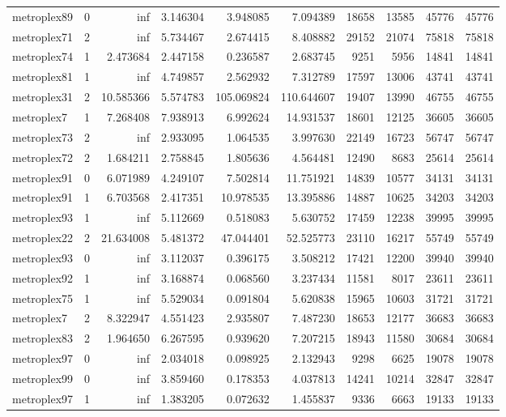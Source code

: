 \begin{longtable}{|l|r|r|r|r|r|r|r|r|r|}
metroplex89 & 0 & inf & 3.146304 & 3.948085 & 7.094389 & 18658 & 13585 & 45776 & 45776 \\
metroplex71 & 2 & inf & 5.734467 & 2.674415 & 8.408882 & 29152 & 21074 & 75818 & 75818 \\
metroplex74 & 1 & 2.473684 & 2.447158 & 0.236587 & 2.683745 & 9251 & 5956 & 14841 & 14841 \\
metroplex81 & 1 & inf & 4.749857 & 2.562932 & 7.312789 & 17597 & 13006 & 43741 & 43741 \\
metroplex31 & 2 & 10.585366 & 5.574783 & 105.069824 & 110.644607 & 19407 & 13990 & 46755 & 46755 \\
metroplex7 & 1 & 7.268408 & 7.938913 & 6.992624 & 14.931537 & 18601 & 12125 & 36605 & 36605 \\
metroplex73 & 2 & inf & 2.933095 & 1.064535 & 3.997630 & 22149 & 16723 & 56747 & 56747 \\
metroplex72 & 2 & 1.684211 & 2.758845 & 1.805636 & 4.564481 & 12490 & 8683 & 25614 & 25614 \\
metroplex91 & 0 & 6.071989 & 4.249107 & 7.502814 & 11.751921 & 14839 & 10577 & 34131 & 34131 \\
metroplex91 & 1 & 6.703568 & 2.417351 & 10.978535 & 13.395886 & 14887 & 10625 & 34203 & 34203 \\
metroplex93 & 1 & inf & 5.112669 & 0.518083 & 5.630752 & 17459 & 12238 & 39995 & 39995 \\
metroplex22 & 2 & 21.634008 & 5.481372 & 47.044401 & 52.525773 & 23110 & 16217 & 55749 & 55749 \\
metroplex93 & 0 & inf & 3.112037 & 0.396175 & 3.508212 & 17421 & 12200 & 39940 & 39940 \\
metroplex92 & 1 & inf & 3.168874 & 0.068560 & 3.237434 & 11581 & 8017 & 23611 & 23611 \\
metroplex75 & 1 & inf & 5.529034 & 0.091804 & 5.620838 & 15965 & 10603 & 31721 & 31721 \\
metroplex7 & 2 & 8.322947 & 4.551423 & 2.935807 & 7.487230 & 18653 & 12177 & 36683 & 36683 \\
metroplex83 & 2 & 1.964650 & 6.267595 & 0.939620 & 7.207215 & 18943 & 11580 & 30684 & 30684 \\
metroplex97 & 0 & inf & 2.034018 & 0.098925 & 2.132943 & 9298 & 6625 & 19078 & 19078 \\
metroplex99 & 0 & inf & 3.859460 & 0.178353 & 4.037813 & 14241 & 10214 & 32847 & 32847 \\
metroplex97 & 1 & inf & 1.383205 & 0.072632 & 1.455837 & 9336 & 6663 & 19133 & 19133 \\

\end{longtable}
